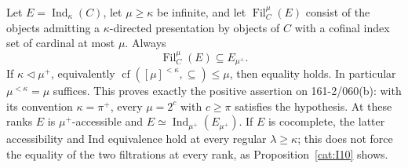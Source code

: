 \begin{theorem}\label{cat:I11}
Let $E=\operatorname{Ind}_\kappa(C)$, let $\mu\geq\kappa$ be infinite,
and let $\operatorname{Fil}^{\mu}_C(E)$ consist of the objects admitting
a $\kappa$-directed presentation by objects of $C$ with a cofinal index
set of cardinal at most $\mu$.  Always
\[
 \operatorname{Fil}^{\mu}_C(E)\subseteq E_{\mu^+}.
\]
If $\kappa\triangleleft\mu^+$, equivalently
$\operatorname{cf}([\mu]^{<\kappa},\subseteq)\leq\mu$, then equality
holds.  In particular $\mu^{<\kappa}=\mu$ suffices.  This proves exactly
the positive assertion on 161-2/060(b): with its convention
$\kappa=\pi^+$, every $\mu=2^c$ with $c\geq\pi$ satisfies the hypothesis.
At these ranks $E$ is $\mu^+$-accessible and
$E\simeq\operatorname{Ind}_{\mu^+}(E_{\mu^+})$.
If $E$ is cocomplete, the latter accessibility and Ind equivalence hold
at every regular $\lambda\geq\kappa$; this does not force the equality
of the two filtrations at every rank, as Proposition~\ref{cat:I10} shows.
\end{theorem}

